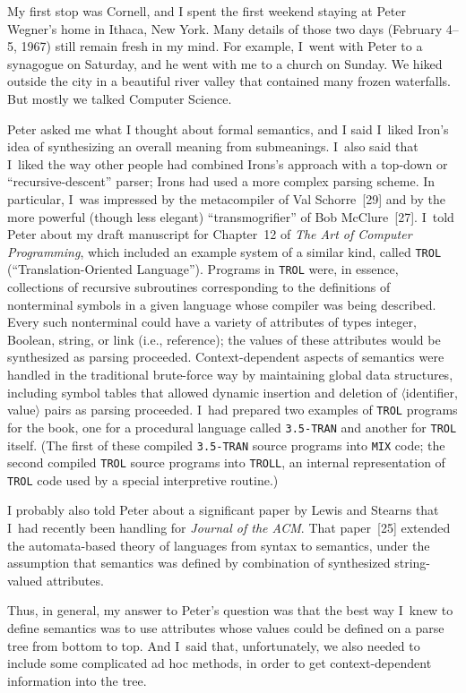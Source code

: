 My first stop was Cornell, and I spent the first weekend staying at
Peter Wegner's home in Ithaca, New York. Many details of those two
days (February 4--5, 1967) still remain fresh in my mind. For example,
I~went with Peter to a synagogue on Saturday, and he went with me to a
church on Sunday. We hiked outside the city in a beautiful river
valley that contained many frozen waterfalls. But mostly we talked
Computer Science.

Peter asked me what I thought about formal semantics, and I said
I~liked Iron's idea of synthesizing an overall meaning from
submeanings. I~also said that I~liked the way other people had
combined Irons's approach with a top-down or ``recursive-descent''
parser; Irons had used a more complex parsing scheme. In particular,
I~was impressed by the metacompiler of Val Schorre~[29]
and by the more powerful (though less elegant) ``transmogrifier'' of
Bob McClure~[27].
I~told Peter about my draft manuscript for Chapter~12 of {\sl The Art
of
Computer Programming}, which included an example system of a similar
kind, called {\tt TROL} (``Translation-Oriented Language''). Programs
in {\tt TROL} were, in essence, collections of recursive subroutines
corresponding to the definitions of nonterminal symbols in a given
language whose compiler was being described. Every such nonterminal
could have a variety of attributes of types integer, Boolean, string,
or link (i.e., reference); the values of these attributes would be
synthesized as parsing proceeded. Context-dependent aspects of 
semantics were handled in the traditional brute-force way by
maintaining global data structures, including symbol tables that
allowed dynamic insertion and deletion of 
$\langle$identifier, value$\rangle$ pairs as
parsing proceeded. I~had prepared two examples of {\tt TROL} programs
for the book, one for a procedural language called {\tt 3.5-TRAN} and
another for {\tt TROL} itself. (The first of these compiled 
{\tt 3.5-TRAN} source programs into {\tt MIX} code; the second compiled
{\tt TROL} source programs into {\tt TROLL}, an internal
representation of {\tt TROL} code used by a special interpretive
routine.)

I probably also told Peter about a significant paper by Lewis and
Stearns that I~had recently been handling for {\sl Journal of the
ACM}. That paper~[25]
extended the automata-based theory of languages from syntax to
semantics, under the assumption that semantics was defined by
combination of synthesized string-valued attributes.

Thus, in general, my answer to Peter's question was that the best way
I~knew to define semantics was to use attributes whose values could be
defined on a parse tree from bottom to top. And I~said that,
unfortunately, we also needed to include some
complicated ad hoc methods, in order to get
context-dependent information into the tree.

